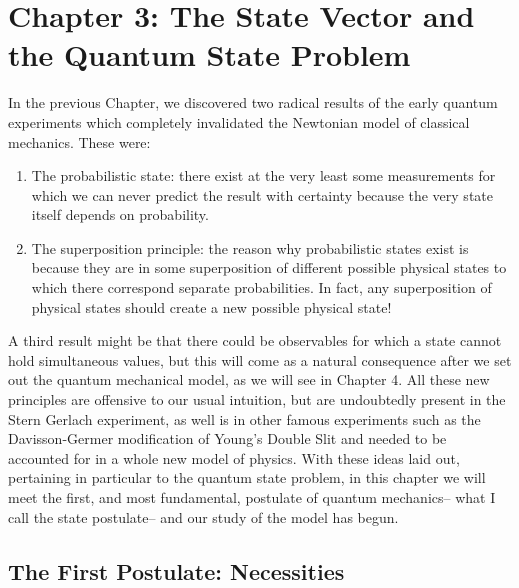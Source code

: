 \chapter{Chapter 3: The State Vector and the Quantum State Problem}
In the previous Chapter, we discovered two radical results of the early quantum experiments which completely invalidated the Newtonian model of classical mechanics. These were:
\begin{enumerate}
    \item The probabilistic state: there exist at the very least some measurements for which we can never predict the result with certainty because the very state itself depends on probability.
    \item The superposition principle: the reason why probabilistic states exist is because they are in some superposition of different possible physical states to which there correspond separate probabilities. In fact, any superposition of physical states should create a new possible physical state!
\end{enumerate} 
A third result might be that there could be observables for which a state cannot hold simultaneous values, but this will come as a natural consequence after we set out the quantum mechanical model, as we will see in Chapter 4. All these new principles are offensive to our usual intuition, but are undoubtedly present in the Stern Gerlach experiment, as well is in other famous experiments such as the Davisson-Germer modification of Young's Double Slit and needed to be accounted for in a whole new model of physics. With these ideas laid out, pertaining in particular to the quantum state problem, in this chapter we will meet the first, and most fundamental, postulate of quantum mechanics-- what I call the state postulate-- and our study of the model has begun.
\section{The First Postulate: Necessities}
